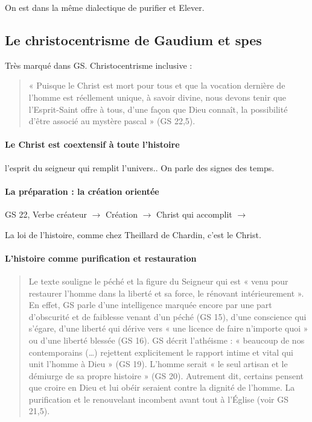 On est dans la même dialectique de purifier et Elever.

\subsection{Le christocentrisme de Gaudium et spes } 

Très marqué dans GS. Christocentrisme inclusive : 
\begin{quote}
    « Puisque le Christ est mort pour tous et que la vocation dernière de l’homme est réellement unique, à savoir divine, nous devons tenir que l’Esprit-Saint offre à tous, d’une façon que Dieu connaît, la possibilité d’être associé au mystère pascal » (GS 22,5).
\end{quote}


\paragraph{Le Christ est coextensif à toute l’histoire }

l'esprit du seigneur qui remplit l'univers.. On parle des signes des temps.




\paragraph{La préparation : la création orientée}
GS 22, 
Verbe créateur $\rightarrow$ Création $\rightarrow$  Christ qui accomplit $\rightarrow$  

La loi de l'histoire, comme chez Theillard de Chardin, c'est le Christ.

\paragraph{L’histoire comme purification et restauration}
 
\begin{quote}
    Le texte souligne le péché et la figure du Seigneur qui est « venu pour restaurer l’homme dans la liberté et sa force, le rénovant intérieurement ». En effet, GS parle d’une intelligence marquée encore par une part d’obscurité et de faiblesse venant d’un péché (GS 15), d’une conscience qui s’égare, d’une liberté qui dérive vers « une licence de faire n’importe quoi » ou d’une liberté blessée (GS 16). GS décrit l’athéisme : « beaucoup de nos contemporains (…) rejettent explicitement le rapport intime et vital qui unit l’homme à Dieu » (GS 19). L’homme serait « le seul artisan et le démiurge de sa propre histoire » (GS 20). Autrement dit, certains pensent que croire en Dieu et lui obéir seraient contre la dignité de l’homme. La purification et le renouvelant incombent avant tout à l’Église (voir GS 21,5).
\end{quote}
